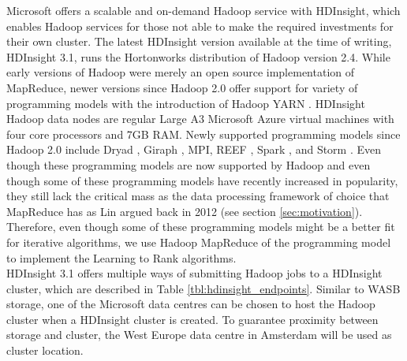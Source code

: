 Microsoft offers a scalable and on-demand Hadoop service with HDInsight, which enables Hadoop services for those not able to make the required investments for their own cluster. The latest HDInsight version available at the time of writing, HDInsight 3.1, runs the Hortonworks distribution of Hadoop version 2.4. While early versions of Hadoop were merely an open source implementation of MapReduce, newer versions since Hadoop 2.0 offer support for variety of programming models with the introduction of Hadoop YARN \cite{Vavilapalli2013}. HDInsight Hadoop data nodes are regular Large A3 Microsoft Azure virtual machines with four core processors and 7GB RAM. Newly supported programming models since Hadoop 2.0 include Dryad \cite{Isard2007}, Giraph \cite{Avery2011}, MPI, REEF \cite{Chun2013}, Spark \cite{Zaharia2010}, and Storm \cite{Aniello2013}. Even though these programming models are now supported by Hadoop and even though some of these programming models have recently increased in popularity, they still lack the critical mass as the data processing framework of choice that MapReduce has as Lin argued back in 2012 \cite{Lin2013}(see section \ref{sec:motivation}). Therefore, even though some of these programming models might be a better fit for iterative algorithms, we use Hadoop MapReduce of the programming model to implement the Learning to Rank algorithms.\\

HDInsight 3.1 offers multiple ways of submitting Hadoop jobs to a HDInsight cluster, which are described in Table \ref{tbl:hdinsight_endpoints}. Similar to \ac{WASB} storage, one of the Microsoft data centres can be chosen to host the Hadoop cluster when a HDInsight cluster is created. To guarantee proximity between storage and cluster, the West Europe data centre in Amsterdam will be used as cluster location.\\

